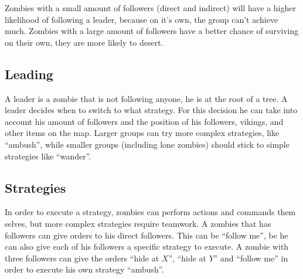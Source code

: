 Zombies with a small amount of followers (direct and indirect) will have a higher likelihood of following a leader, because on it's own, the group can't achieve much. Zombies with a large amount of followers have a better chance of surviving on their own, they are more likely to desert.

\subsection{Leading}
A leader is a zombie that is not following anyone, he is at the root of a tree. A leader decides when to switch to what strategy. For this decision he can take into account his amount of followers and the position of his followers, vikings, and other items on the map. Larger groups can try more complex strategies, like ``ambush'', while smaller groups (including lone zombies) should stick to simple strategies like ``wander''.

\subsection{Strategies}
In order to execute a strategy, zombies can perform actions and commands them selves, but more complex strategies require teamwork. A zombies that has followers can give orders to his direct followers. This can be ``follow me'', be he can also give each of his followers a specific strategy to execute. A zombie with three followers can give the orders ``hide at $X$'', ``hide at $Y$'' and ``follow me'' in order to execute his own strategy ``ambush''.

\FloatBarrier